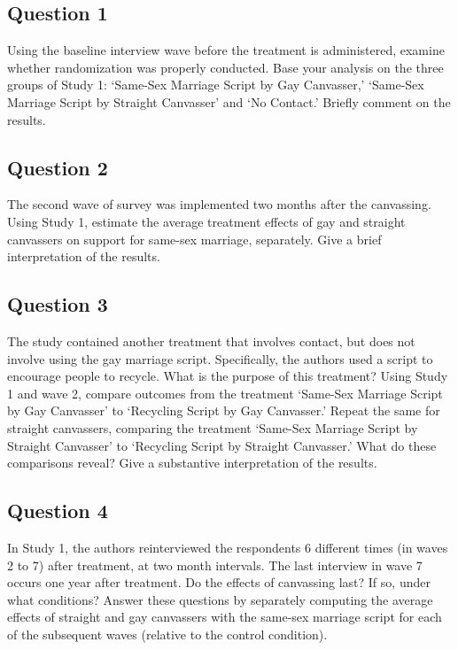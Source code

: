\documentclass[]{article}
\begin{document}
\subsection{Question 1}\label{question-1}

Using the baseline interview wave before the treatment is administered,
examine whether randomization was properly conducted. Base your analysis
on the three groups of Study 1: `Same-Sex Marriage Script by Gay
Canvasser,' `Same-Sex Marriage Script by Straight Canvasser' and `No
Contact.' Briefly comment on the results.

\subsection{Question 2}\label{question-2}

The second wave of survey was implemented two months after the
canvassing. Using Study 1, estimate the average treatment effects of gay
and straight canvassers on support for same-sex marriage, separately.
Give a brief interpretation of the results.

\subsection{Question 3}\label{question-3}

The study contained another treatment that involves contact, but does
not involve using the gay marriage script. Specifically, the authors
used a script to encourage people to recycle. What is the purpose of
this treatment? Using Study 1 and wave 2, compare outcomes from the
treatment `Same-Sex Marriage Script by Gay Canvasser' to `Recycling
Script by Gay Canvasser.' Repeat the same for straight canvassers,
comparing the treatment `Same-Sex Marriage Script by Straight Canvasser'
to `Recycling Script by Straight Canvasser.' What do these comparisons
reveal? Give a substantive interpretation of the results.

\subsection{Question 4}\label{question-4}

In Study 1, the authors reinterviewed the respondents 6 different times
(in waves 2 to 7) after treatment, at two month intervals. The last
interview in wave 7 occurs one year after treatment. Do the effects of
canvassing last? If so, under what conditions? Answer these questions by
separately computing the average effects of straight and gay canvassers
with the same-sex marriage script for each of the subsequent waves
(relative to the control condition).
\end{document}
